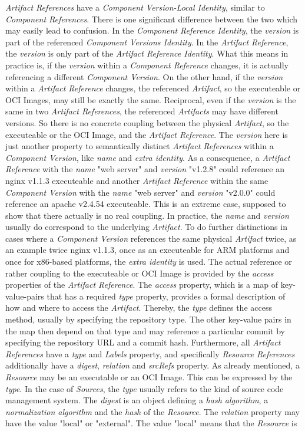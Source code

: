 \emph{Artifact References} have a \emph{Component Version-Local Identity}, similar to \emph{Component References}. There is one significant difference between the two which may easily lead to confusion. In the \emph{Component Reference Identity}, the \emph{version} is part of the referenced \emph{Component Versions Identity}. In the \emph{Artifact Reference}, the \emph{version} is only part of the \emph{Artifact Reference Identity}. What this means in practice is, if the \emph{version} within a \emph{Component Reference} changes, it is actually referencing a different \emph{Component Version}. On the other hand, if the \emph{version} within a \emph{Artifact Reference} changes, the referenced \emph{Artifact}, so the executeable or OCI Images, may still be exactly the same. Reciprocal, even if the \emph{version} is the same in two \emph{Artifact References}, the referenced \emph{Artifacts} may have different versions. So there is no concrete coupling between the physical \emph{Artifact}, so the executeable or the OCI Image, and the \emph{Artifact Reference}. The \emph{version} here is just another property to semantically distinct \emph{Artifact References} within a \emph{Component Version}, like \emph{name} and \emph{extra identity}. As a consequence, a \emph{Artifact Reference} with the \emph{name} "web server" and \emph{version} "v1.2.8" could reference an nginx v1.1.3 executeable and another \emph{Artifact Reference} within the same \emph{Component Version} with the \emph{name} "web server" and \emph{version} "v2.0.0" could reference an apache v2.4.54 executeable. This is an extreme case, supposed to show that there actually is no real coupling. In practice, the \emph{name} and \emph{version} usually do correspond to the underlying \emph{Artifact}. To do further distinctions in cases where a \emph{Component Version} references the same physical \emph{Artifact} twice, as an example twice nginx v1.1.3, once as an executeable for ARM platforms and once for x86-based platforms, the \emph{extra identity} is used. The actual reference or rather coupling to the executeable or OCI Image is provided by the \emph{access} properties of the \emph{Artifact Reference}. The \emph{access} property, which is a map of key-value-pairs that has a required \emph{type} property, provides a formal description of how and where to access the \emph{Artifact}. Thereby, the \emph{type} defines the access method, usually by specifying the repository type. The other key-value pairs in the map then depend on that type and may reference a particular commit by specifying the repository URL and a commit hash. Furthermore, all \emph{Artifact References} have a \emph{type} and \emph{Labels} property, and specifically \emph{Resource References} additionally have a \emph{digest}, \emph{relation} and \emph{srcRefs} property. As already mentioned, a \emph{Resource} may be an executable or an OCI Image. This can be expressed by the \emph{type}. In the case of \emph{Sources}, the \emph{type} usually refers to the kind of source code management system. The \emph{digest} is an object defining a \emph{hash algorithm}, a \emph{normalization algorithm} and the \emph{hash} of the \emph{Resource}. The \emph{relation} property may have the value "local" or "external". The value "local" means that the \emph{Resource} is 